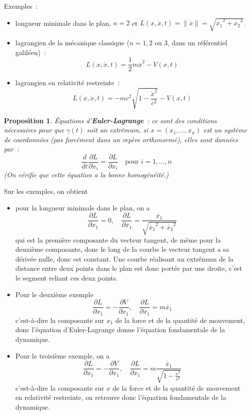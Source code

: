 \documentclass[a4paper,11pt]{article}
\newtheorem{prop}[thm]{Proposition}
\begin{document}
\begin{giacjshere}
Exemples~: 
\begin{itemize}
\item
longueur minimale dans le plan, $n=2$ et 
$L(x,\dot{x},t)=\| \dot{x} \|=\sqrt{\dot{x_1}^2+\dot{x_2}^2}$.
\item lagrangien de la m\'ecanique classique ($n=1,2$ ou 3, dans un
  r\'ef\'erentiel galil\'een)~:
$$L(x,\dot{x},t)=\frac12m\dot{x}^2-V(x,t)$$
\item lagrangien en relativit\'e restreinte~:
$$ L(x,\dot{x},t)=-mc^2\sqrt{1-\frac{\dot{x}^2}{c^2}}-V(x,t)$$
\end{itemize}

\begin{prop}
\'Equations d'{\bf Euler-Lagrange}~: 
ce sont des conditions n\'ecessaires
pour que $\gamma(t)$ soit un extr\^emum, si
$x=(x_1,...,x_n)$ est un syst\`eme de coordonn\'ees (pas
forc\'ement dans un rep\`ere orthonorm\'e),
elles sont donn\'ees par~:
$$ \frac{d}{dt} \frac{\partial L}{\partial \dot{x_i}} = 
\frac{\partial L}{\partial x_i} \quad \mbox{pour } i=1,...,n$$
(On v\'erifie que cette \'equation a la bonne homog\'en\'eit\'e.)
\end{prop}

Sur les exemples, on obtient
\begin{itemize}
\item pour la longueur minimale dans le plan, on a 
$$\frac{\partial L}{\partial x_1}=0, \quad
\frac{\partial L} {\partial \dot{x_1}}=\frac{\dot{x_1}} {\sqrt{\dot{x_1}^2+\dot{x_2}^2}}
$$
qui est la premi\`ere composante du vecteur tangent,
de m\^eme pour la deuxi\`eme composante, 
donc le long de la courbe le vecteur tangent a sa d\'eriv\'ee
nulle, donc est constant. Une
courbe r\'ealisant un extr\^emum de la distance entre deux points
dans le plan est donc port\'ee par une droite, c'est le segment
reliant ces deux points.
\item Pour le deuxi\`eme exemple
$$ \frac{\partial L}{\partial x_1}=-\frac{\partial V}{\partial x_1},
\quad \frac{\partial L}{\partial x_1}=m\dot{x_1}
$$
c'est-\`a-dire la composante sur $x_1$ de la force et
de la quantit\'e de mouvement, donc l'\'equation d'Euler-Lagrange
donne l'\'equation fondamentale de la dynamique.
\item
Pour le troisi\`eme exemple, on a
$$ \frac{\partial L}{\partial x_1}=-\frac{\partial V}{\partial x_1},
\quad \frac{\partial L}{\partial x_1}=m\frac{\dot{x_1}}{\sqrt{1- 
\frac{\dot{x}^2}{c^2}}}
$$
c'est-\`a-dire la composante sur $x$ de la force et
de la quantit\'e de mouvement en relativit\'e restreinte,
on retrouve donc l'\'equation fondamentale de la dynamique.
\end{itemize}


\end{giacjshere}
\end{document}
